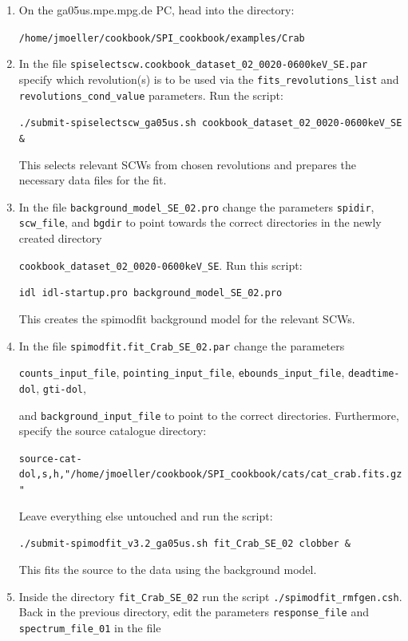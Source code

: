 \documentclass{report}
\begin{document}
\begin{enumerate}
    \item On the ga05us.mpe.mpg.de PC, head into the directory:
    
    \verb|/home/jmoeller/cookbook/SPI_cookbook/examples/Crab|

    \item \label{scw select} In the file \verb|spiselectscw.cookbook_dataset_02_0020-0600keV_SE.par| specify which revolution(s) is to be used via the \verb|fits_revolutions_list| and \verb|revolutions_cond_value| parameters. Run the script:
    
    \verb|./submit-spiselectscw_ga05us.sh cookbook_dataset_02_0020-0600keV_SE &|

    This selects relevant SCWs from chosen revolutions and prepares the necessary data files for the fit.

    \item \label{step background} In the file \verb|background_model_SE_02.pro| change the parameters \verb|spidir|, \verb|scw_file|, and \verb|bgdir| to point towards the correct directories in the newly created directory 
    
    \verb|cookbook_dataset_02_0020-0600keV_SE|. Run this script: 
    
    \verb|idl idl-startup.pro background_model_SE_02.pro|

    This creates the spimodfit background model for the relevant SCWs.

    \item \label{Source directory} In the file \verb|spimodfit.fit_Crab_SE_02.par| change the parameters 
    
    \verb|counts_input_file|, \verb|pointing_input_file|, \verb|ebounds_input_file|, \verb|deadtime-dol|, \verb|gti-dol|, 
    
    and \verb|background_input_file| to point to the correct directories. Furthermore, specify the source catalogue directory:
    
    \verb|source-cat-dol,s,h,"/home/jmoeller/cookbook/SPI_cookbook/cats/cat_crab.fits.gz"|

    Leave everything else untouched and run the script:

    \verb|./submit-spimodfit_v3.2_ga05us.sh fit_Crab_SE_02 clobber &|

    This fits the source to the data using the background model.

    \item \label{Spectrum file} Inside the directory \verb|fit_Crab_SE_02| run the script \verb|./spimodfit_rmfgen.csh|. Back in the previous directory, edit the parameters \verb|response_file| and \verb|spectrum_file_01| in the file 
    

\end{enumerate}
\end{document}
